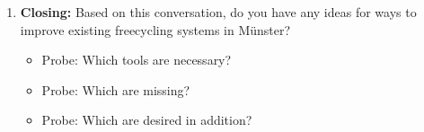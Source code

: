 \begin{enumerate}
    \item \textbf{Closing:} Based on this conversation, do you have any ideas for ways to improve existing freecycling systems in Münster?

    \begin{itemize}
        \item Probe: Which tools are necessary?
        \item Probe: Which are missing?
        \item Probe: Which are desired in addition?
    \end{itemize}
\end{enumerate}
